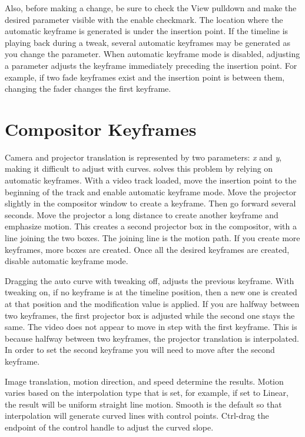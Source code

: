 Also, before making a change, be sure to check the View pulldown and make the desired parameter visible with the enable checkmark.  The location where the automatic keyframe is generated is under the insertion point.  If the timeline is playing back during a tweak, several automatic keyframes may be generated as you change the parameter.  When automatic keyframe mode is disabled, adjusting a parameter adjusts the keyframe immediately preceding the insertion point.  For example, if two fade keyframes exist and the insertion point is between them, changing the fader changes the first keyframe.

\section{Compositor Keyframes}%
\label{sec:compositor_keyframes}

Camera and projector translation is represented by two parameters: \textit{x} and \textit{y}, making it difficult to adjust with curves.  \CGG{} solves this problem by relying on automatic keyframes.  With a video track loaded, move the insertion point to the beginning of the track and enable automatic keyframe mode.  Move the projector slightly in the compositor window to create a keyframe.  Then go forward several seconds.  Move the projector a long distance to create another keyframe and emphasize motion.  This creates a second projector box in the compositor, with a line joining the two boxes. The joining line is the motion path.  If you create more keyframes, more boxes are created.  Once all the desired keyframes are created, disable automatic keyframe mode.

Dragging the auto curve with tweaking off, adjusts the previous keyframe.  With tweaking on, if no keyframe is at the timeline position, then a new one is created at that position and the modification value is applied.  If you are halfway between two keyframes, the first projector box is adjusted while the second one stays the same.  The video does not appear to move in step with the first keyframe.  This is because halfway between two keyframes, the projector translation is interpolated.  In order to set the second keyframe you will need to move after the second keyframe.

Image translation, motion direction, and speed determine the results.  Motion varies based on the  interpolation type that is set, for example, if set to Linear, the result will be uniform straight line motion.  Smooth is the default so that interpolation will generate curved lines with control points.  Ctrl-drag the endpoint of the control handle to adjust the curved slope.

